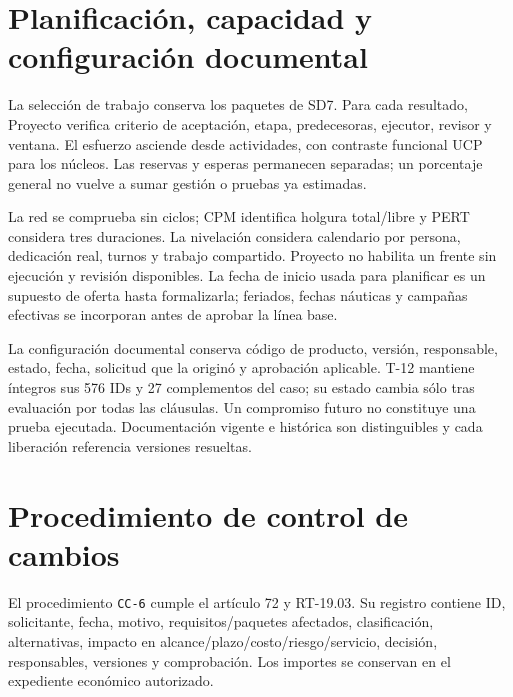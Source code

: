 \section{Planificación, capacidad y configuración documental}
La selección de trabajo conserva los paquetes de SD7. Para cada resultado, Proyecto verifica criterio de aceptación, etapa, predecesoras, ejecutor, revisor y ventana. El esfuerzo asciende desde actividades, con contraste funcional UCP para los núcleos. Las reservas y esperas permanecen separadas; un porcentaje general no vuelve a sumar gestión o pruebas ya estimadas.

La red se comprueba sin ciclos; CPM identifica holgura total/libre y PERT considera tres duraciones. La nivelación considera calendario por persona, dedicación real, turnos y trabajo compartido. Proyecto no habilita un frente sin ejecución y revisión disponibles. La fecha de inicio usada para planificar es un supuesto de oferta hasta formalizarla; feriados, fechas náuticas y campañas efectivas se incorporan antes de aprobar la línea base.

La configuración documental conserva código de producto, versión, responsable, estado, fecha, solicitud que la originó y aprobación aplicable. T-12 mantiene íntegros sus 576 IDs y 27 complementos del caso; su estado cambia sólo tras evaluación por todas las cláusulas. Un compromiso futuro no constituye una prueba ejecutada. Documentación vigente e histórica son distinguibles y cada liberación referencia versiones resueltas.

\section{Procedimiento de control de cambios}
El procedimiento \texttt{CC-6} cumple el artículo 72 y RT-19.03. Su registro contiene ID, solicitante, fecha, motivo, requisitos/paquetes afectados, clasificación, alternativas, impacto en alcance/plazo/costo/riesgo/servicio, decisión, responsables, versiones y comprobación. Los importes se conservan en el expediente económico autorizado. \parencites[art.~72, p.~38]{sd6-ba}[RT-19.03, p.~33]{sd6-bt}

